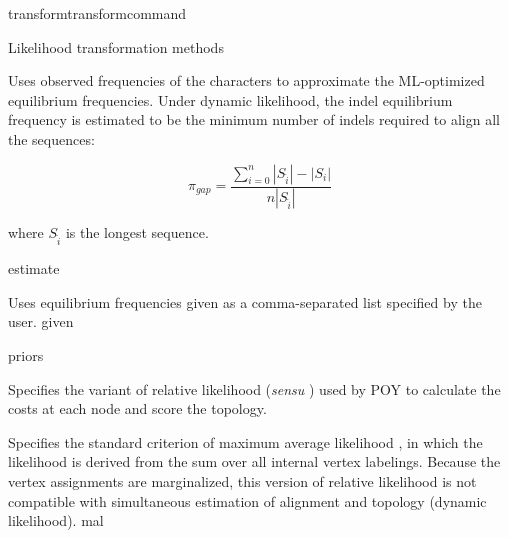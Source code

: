 \begin{command}{transform}{transformcommand}
\begin{arguments}
\begin{argumentgroup}{Likelihood transformation methods}
{\begin{description}
                            {Uses observed frequencies of the characters to
                            approximate the ML-optimized equilibrium
                            frequencies.  Under dynamic likelihood, the indel
                            equilibrium frequency is estimated to be the minimum
                            number of indels required to align all the
                            sequences: 
                            
                         
                            \begin{equation*}
                            \pi_{gap} = \frac{\sum_{i=0}^n
                            |S_{\hat{i}}| - |S_i|}{n |S_{\hat{i}}|}
                            \end{equation*}
                            
                             where
                            $S_{\hat{i}}$ is the longest sequence.}
                            {estimate}

                            {Uses equilibrium frequencies given as a
                            comma-separated list specified by the user.}
                            {given}

                    \end{description}}
                {priors}

                    {Specifies the variant of relative likelihood (\textit{sensu}
                    \cite{steel2000parsimony}) used by POY to calculate the costs at
                    each node and score the topology.

                    \begin{description}

                            {Specifies the standard criterion of maximum average
                            likelihood \cite{felsenstein1981}, in which the
                            likelihood is derived from the sum over all internal
                            vertex labelings. Because the vertex assignments are
                            marginalized, this version of relative likelihood is not
                            compatible with simultaneous estimation of alignment and
                            topology (dynamic likelihood).}
                            {mal}


\end{description}}
\end{argumentgroup}
\end{arguments}
\end{command}

